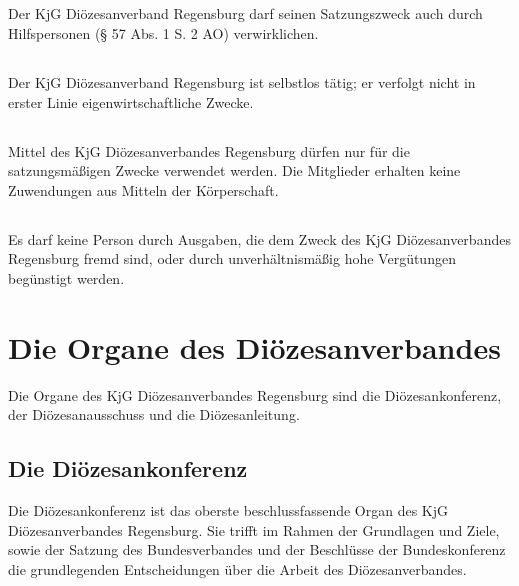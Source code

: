 \documentclass[12pt]{report}
\newcommand{\nocontentsline}[3]{}
\newcommand{\tocless}[2]{\bgroup\let\addcontentsline=\nocontentsline#1{#2}\egroup}
\begin{document}
\begin{justify}
\begin{itemize}
\begin{itemize}
    \end{itemize}
\end{itemize}
\tocless\subsection{}
Der KjG Diözesanverband Regensburg darf seinen Satzungszweck auch durch Hilfspersonen (§ 57 Abs. 1 S. 2 AO) verwirklichen.
\tocless\subsection{}
Der KjG Diözesanverband Regensburg ist selbstlos tätig; er verfolgt nicht in erster Linie eigenwirtschaftliche Zwecke.
\tocless\subsection{}
Mittel des KjG Diözesanverbandes Regensburg dürfen nur für die satzungsmäßigen Zwecke
verwendet werden. Die Mitglieder erhalten keine Zuwendungen aus Mitteln der Körperschaft.
\tocless\subsection{}
Es darf keine Person durch Ausgaben, die dem Zweck des KjG Diözesanverbandes Regensburg
fremd sind, oder durch unverhältnismäßig hohe Vergütungen begünstigt werden.
\section{Die Organe des Diözesanverbandes}
Die Organe des KjG Diözesanverbandes Regensburg sind die Diözesankonferenz, der Diözesanausschuss und die
Diözesanleitung.

\subsection{Die Diözesankonferenz}
Die Diözesankonferenz ist das oberste beschlussfassende Organ des KjG Diözesanverbandes Regensburg. Sie
trifft im Rahmen der Grundlagen und Ziele, sowie der Satzung des Bundesverbandes und der
Beschlüsse der Bundeskonferenz die grundlegenden Entscheidungen über die Arbeit des Diözesanverbandes.

\end{justify}
\end{document}

